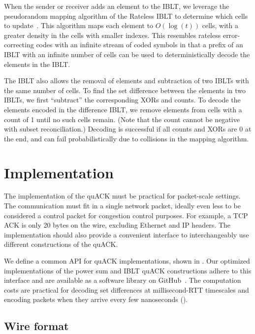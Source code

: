When the sender or receiver adds an element to the IBLT, we leverage the
pseudorandom mapping algorithm of the Rateless IBLT to determine which cells
to update~\cite{yang2024practical}. This algorithm maps each element to
$O(\log(t))$ cells, with a greater density in the cells with smaller indexes.
This resembles rateless error-correcting codes with an infinite stream of coded
symbols in that a prefix of an IBLT with an infinite number of cells can be
used to deterministically decode the elements in the IBLT.

The IBLT also allows the removal of elements and subtraction of two IBLTs with
the same number of cells. To find the set difference between the elements in
two IBLTs, we first ``subtract'' the corresponding XORs and counts. To decode
the elements encoded in the difference IBLT, we remove elements from cells with
a count of 1 until no such cells remain. (Note that the count cannot be
negative with subset reconciliation.) Decoding is successful if all counts
and XORs are 0 at the end, and can fail probabilistically due to collisions in
the mapping algorithm.

\section{Implementation}
\label{sec:quack:implementation}

The implementation of the quACK must be practical for packet-scale settings. The
communication must fit in a single network packet, ideally even less to be
considered a control packet for congestion control purposes. For example, a TCP
ACK is only 20 bytes on the wire, excluding Ethernet and IP headers.
The implementation should also provide a convenient interface to
interchangeably use different constructions of the quACK.

We define a common API for quACK implementations, shown in
. Our optimized implementations of the power sum and
IBLT quACK constructions adhere to this interface and are available as a
software library on GitHub~\cite{quack-github}.
The computation costs are practical for decoding set differences at
millisecond-RTT timescales and encoding packets when they arrive every few
nanoseconds ().

\subsection{Wire format}

